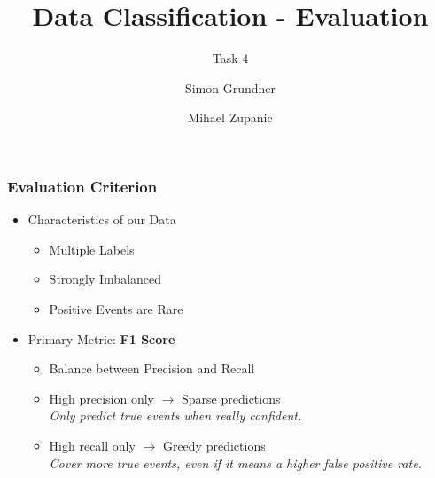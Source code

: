 \documentclass[
    utf8,
    aspectratio=169,
    ngerman,
    english,
    handout
]{beamer}
\begin{document}

\title{Data Classification - Evaluation}
\subtitle{Task 4}

\author{Simon Grundner \and Mihael Zupanic}

\date[\today]{}



\maketitle

\begin{frame}
\frametitle{Evaluation Criterion}
\begin{itemize}
\item Characteristics of our Data
\begin{itemize}
\item Multiple Labels
\item Strongly Imbalanced
\item Positive Events are Rare
\end{itemize}
\item Primary Metric: \textbf{F1 Score}
\begin{itemize}
\item Balance between Precision and Recall
\item High precision only $\rightarrow$ Sparse predictions \\
\textit{Only predict true events when really confident.}
\item High recall only $\rightarrow$ Greedy predictions \\
\textit{Cover more true events, even if it means a higher false positive rate.}
\end{itemize}
\end{itemize}
\end{frame}
\end{document}
